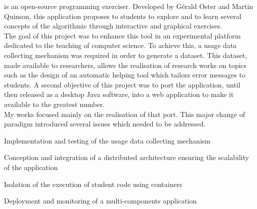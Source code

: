 \documentclass[]{deedy-resume-openfont}
\begin{document}
\hfill\begin{minipage}{\dimexpr\textwidth-0.5cm}
\href{http://people.irisa.fr/Martin.Quinson/Teaching/PLM/}{}
is an open-source programming exerciser.
Developed by Gérald Oster and Martin Quinson, this application proposes to students
to explore and to learn several concepts of the algorithmic through interactive and graphical exercises.
\\
The goal of this project was to enhance this tool in an experimental platform dedicated
to the teaching of computer science.
To achieve this, a usage data collecting mechanism was required in order to generate a dataset.
This dataset, made available to researchers, allows the realisation of research works on topics
such as the design of an automatic helping tool which tailors error messages to students.
A second objective of this project was to port the application, until then released as
a desktop Java software, into a web application to make it available to the greatest number.
\\
My works focused mainly on the realisation of that port.
This major change of paradigm introduced several issues which needed to be addressed.
\begin{tightemize}
    \item Implementation and testing of the usage data collecting mechanism
    \item Conception and integration of a distributed architecture ensuring the scalability of the application
    \item Isolation of the execution of student code using containers
    \item Deployment and monitoring of a multi-components application
\end{tightemize}
\sectionsep\xdef\tpd{\the\prevdepth}
\end{minipage}

\sectionsep
\end{document}
